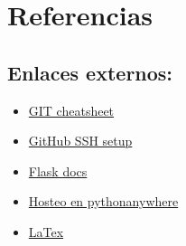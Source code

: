 \section{Referencias}

\subsection{Enlaces externos:}

\begin{itemize}
    
\item \href{https://education.github.com/git-cheat-sheet-education.pdf}{GIT cheatsheet}
\item \href{https://docs.github.com/en/authentication/connecting-to-github-with-ssh}{GitHub SSH setup}
\item \href{https://flask.palletsprojects.com/en/3.0.x/}{Flask docs}
\item \href{https://pythonhow.com/python-tutorial/flask/deploy-flask-web-app-pythonanywhere/}{Hosteo en pythonanywhere}
\item \href{https://www.overleaf.com/learn/latex/Learn_LaTeX_in_30_minutes}{LaTex}
\end{itemize}
